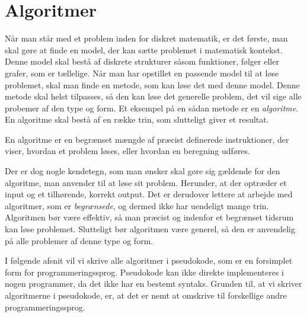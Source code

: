 \chapter{Algoritmer} \label{kap.algo}
Når man står med et problem inden for diskret matematik, er det første, man skal gøre at finde en model, der kan sætte problemet i matematisk kontekst. Denne model skal bestå af diskrete strukturer såsom funktioner, følger eller grafer, som er tællelige. Når man har opstillet en passende model til at løse problemet, skal man finde en metode, som kan løse det med denne model. Denne metode skal helst tilpasses, så den kan løse det generelle problem, det vil sige alle probemer af den type og form. Et eksempel på en sådan metode er en \emph{algoritme}. En algoritme skal bestå af en række trin, som slutteligt giver et resultat. 
\begin{defn}
[Algoritmer] En algoritme er en begrænset mængde af præcist definerede instruktioner, der viser, hvordan et problem løses, eller hvordan en beregning udføres. 
\end{defn}

Der er dog nogle kendetegn, som man ønsker skal gøre sig gældende for den algoritme, man anvender til at løse sit problem. Herunder, at der optræder et input og et tilhørende, korrekt output. Det er derudover lettere at arbejde med algoritmer, som er \emph{begrænsede}, og dermed ikke har uendeligt mange trin. Algoritmen bør være effektiv, så man præcist og indenfor et begrænset tidsrum kan løse problemet. Slutteligt bør algoritmen være generel, så den er anvendelig på alle problemer af denne type og form.

I følgende afsnit vil vi skrive alle algoritmer i pseudokode, som er en forsimplet form for programmeringssprog. Pseudokode kan ikke direkte implementeres i nogen programmer, da det ikke har en bestemt syntaks. Grunden til, at vi skriver algoritmerne i pseudokode, er, at det er nemt at omskrive til forskellige andre programmeringssprog.







